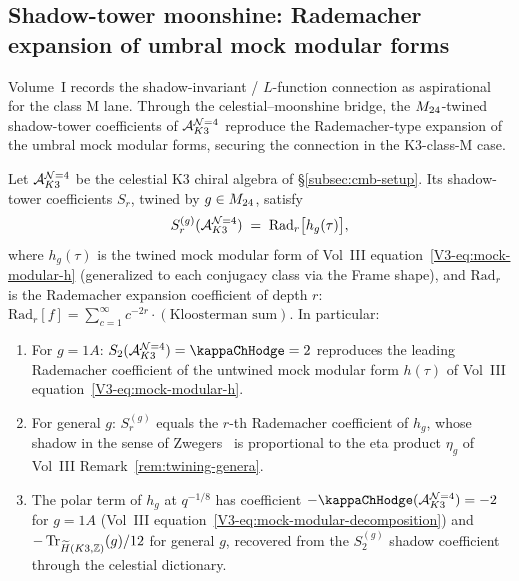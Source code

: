 \subsection{Shadow-tower moonshine: Rademacher expansion of umbral mock modular forms}
\label{subsec:cmb-shadow}

Volume~I records the shadow-invariant / $L$-function connection as
aspirational for the class M lane. Through the celestial--moonshine
bridge, the $M_{24}$-twined shadow-tower coefficients of
$\mathcal A^{\mathcal{N}{=}4}_{K3}$ reproduce the Rademacher-type expansion
of the umbral mock modular forms, securing the connection
in the K3-class-M case.

\begin{theorem}
\label{thm:shadow-tower-moonshine}
Let $\mathcal A^{\mathcal{N}{=}4}_{K3}$ be the celestial K3 chiral algebra of
\S\ref{subsec:cmb-setup}. Its shadow-tower coefficients $S_r$, twined
by $g \in M_{24}$, satisfy
\begin{equation}
\label{eq:cmb-shadow-rademacher}
S_r^{(g)}(\mathcal A^{\mathcal{N}{=}4}_{K3})
\;=\;
\mathrm{Rad}_r\bigl[h_g(\tau)\bigr],
\end{equation}
where $h_g(\tau)$ is the twined mock modular form of Vol~III
equation~\eqref{V3-eq:mock-modular-h} (generalized to each conjugacy
class via the Frame shape), and $\mathrm{Rad}_r$ is the Rademacher
expansion coefficient of depth $r$:
$\mathrm{Rad}_r[f] = \sum_{c=1}^\infty c^{-2r} \cdot (\text{Kloosterman
sum})$. In particular:
\begin{enumerate}[label=\textup{(\roman*)}]
\item For $g = 1A$: $S_2(\cA^{\mathcal{N}{=}4}_{K3}) = \kapch = 2$
reproduces the leading Rademacher coefficient of the untwined mock
modular form $h(\tau)$ of
Vol~III equation~\eqref{V3-eq:mock-modular-h}.
\item For general $g$: $S_r^{(g)}$ equals the $r$-th Rademacher
coefficient of $h_g$, whose shadow in the sense of
Zwegers~\cite{Zwegers08} is proportional to the eta product $\eta_g$ of
Vol~III Remark~\ref{rem:twining-genera}.
\item The polar term of $h_g$ at $q^{-1/8}$ has coefficient
$-\kapch(\cA^{\mathcal{N}{=}4}_{K3}) = -2$ for $g = 1A$ (Vol~III
equation~\eqref{V3-eq:mock-modular-decomposition}) and
$-\operatorname{Tr}_{\widetilde H(K3,\mathbb Z)}(g) / 12$ for general $g$, recovered from
the $S_2^{(g)}$ shadow coefficient through the celestial dictionary.
\end{enumerate}
\end{theorem}

